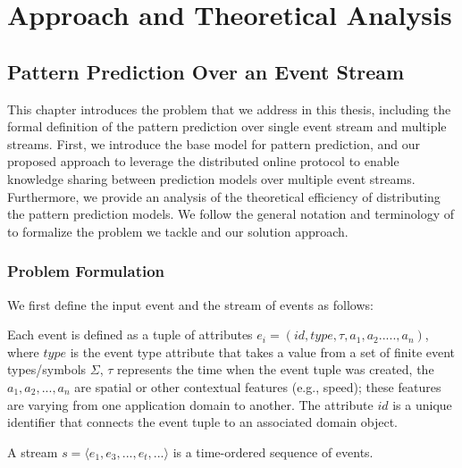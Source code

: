 \chapter{Approach and Theoretical Analysis}
\label{sec:system}
\section{Pattern Prediction Over an Event Stream}



This chapter introduces the problem that we address in this thesis, including the formal definition of the pattern prediction over single event stream and multiple streams. First, we introduce the base model for pattern prediction, and our proposed approach to leverage the distributed online protocol to enable knowledge sharing between prediction models over multiple event streams. Furthermore, we provide an analysis of the theoretical efficiency of distributing the pattern prediction models.
We follow the general notation and terminology of \cite{schultz2009distributed,luckham2008power,alevizos2015complex,zhou_pattern_2015,kamp2014communication} to formalize the problem we tackle and our solution approach.

\subsection{Problem Formulation}

We first define the input event and the stream of events as follows:  
\begin{definition}
	Each event is defined as a tuple of attributes $e_i = (id,type,\tau,a_1,a_2.....,a_n)$, where $type$ is the event type attribute that takes a value from a set of finite event types/symbols $\Sigma$, $\tau$ represents the time when the event tuple was created,  the  $a_1,a_2,...,a_n$ are spatial or other contextual features (e.g., speed); these features are varying from one application domain to another. The attribute $id$ is a unique identifier that connects the event tuple to an associated domain object.
\end{definition}

\begin{definition}
A stream $s=\langle e_1,e_3,...,e_t,...\rangle$  is a time-ordered sequence of events.
\end{definition}


